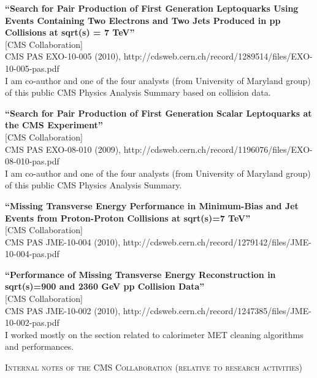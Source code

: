 \documentclass[10pt, a4paper]{article}
\begin{document}
\begin{thebibliography}{599}
{\bf ``Search for Pair Production of First Generation Leptoquarks Using Events Containing Two Electrons and Two Jets Produced in pp Collisions at sqrt(s) = 7 TeV''}
  \\{}[CMS Collaboration]
  \\{}CMS PAS EXO-10-005 (2010), http://cdsweb.cern.ch/record/1289514/files/EXO-10-005-pas.pdf 
  \\I am co-author and one of the four analysts (from University of Maryland group) of this public CMS Physics Analysis Summary based on collision data.

{\bf ``Search for Pair Production of First Generation Scalar Leptoquarks at the CMS Experiment''}
  \\{}[CMS Collaboration]
  \\{}CMS PAS EXO-08-010 (2009), http://cdsweb.cern.ch/record/1196076/files/EXO-08-010-pas.pdf
  \\I am co-author and one of the four analysts (from University of Maryland group) of this public CMS Physics Analysis Summary.

{\bf ``Missing Transverse Energy Performance in Minimum-Bias and Jet Events from Proton-Proton Collisions at sqrt(s)=7 TeV''}
  \\{}[CMS Collaboration]
  \\{}CMS PAS JME-10-004 (2010), http://cdsweb.cern.ch/record/1279142/files/JME-10-004-pas.pdf 

{\bf ``Performance of Missing Transverse Energy Reconstruction in sqrt(s)=900 and 2360 GeV pp Collision Data''}
  \\{}[CMS Collaboration]
  \\{}CMS PAS JME-10-002 (2010), http://cdsweb.cern.ch/record/1247385/files/JME-10-002-pas.pdf 
  \\ I worked mostly on the section related to calorimeter MET cleaning algorithms and performances.

\vspace{0.1cm} \begin{center} \textsc{Internal notes of the CMS Collaboration (relative to research activities)} \end{center} \vspace{0.05cm}


\end{thebibliography}
\end{document}
